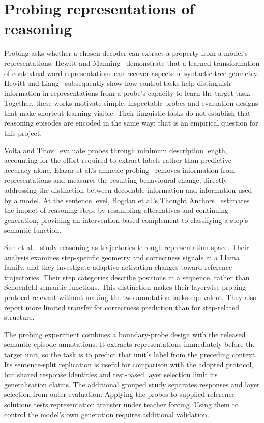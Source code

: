 \documentclass[12pt,a4paper,twoside,openright]{book}
\begin{document}
\section{Probing representations of reasoning}

Probing asks whether a chosen decoder can extract a property from a model's
representations. Hewitt and Manning~\cite{hewitt2019structural} demonstrate
that a learned transformation of contextual word representations can recover
aspects of syntactic tree geometry. Hewitt and Liang~\cite{hewitt2019control}
subsequently show how control tasks help distinguish information in
representations from a probe's capacity to learn the target task. Together, these
works motivate simple, inspectable probes and evaluation designs that make
shortcut learning visible. Their linguistic tasks do not establish that
reasoning episodes are encoded in the same way; that is an empirical question
for this project.

Voita and Titov~\cite{voita2020mdl} evaluate probes through minimum description
length, accounting for the effort required to extract labels rather than
predictive accuracy alone.
Elazar et al.'s amnesic probing~\cite{elazar2021amnesic} removes information
from representations and measures the resulting behavioural change, directly
addressing the distinction between decodable information and information used
by a model.
At the sentence level, Bogdan et al.'s Thought Anchors~\cite{bogdan2025anchors}
estimates the impact of reasoning steps by resampling alternatives and
continuing generation, providing an intervention-based complement to
classifying a step's semantic function.

Sun et al.~\cite{sun2026trajectories} study reasoning as trajectories through
representation space. Their analysis examines step-specific geometry
and correctness signals in a Llama family, and they investigate adaptive
activation changes toward reference trajectories. Their step categories
describe positions in a sequence, rather than Schoenfeld semantic functions.
This distinction makes their layerwise probing protocol relevant without
making the two annotation tasks equivalent. They also report more limited
transfer for correctness prediction than for step-related structure.

The probing experiment combines a boundary-probe design with the released
semantic episode annotations. It extracts representations immediately
before the target unit, so the task is to predict that unit's label from the
preceding context. Its sentence-split replication is useful for comparison with the adopted
protocol, but shared response identities and test-based layer selection limit
its generalisation claims. The additional grouped study separates responses
and layer selection from outer evaluation. Applying the probes to supplied reference
solutions tests representation transfer under teacher forcing. Using them
to control the model's own generation requires additional validation.
\end{document}
